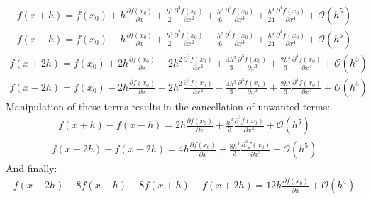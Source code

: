 \documentclass[12pt,a4]{article}
\begin{document}
\begin{enumerate}
\begin{enumerate}
\begin{align*}
          f(x + h) = f(x_0) + h \frac{\partial f(x_0)}{\partial x} + \frac{h^2}{2} \frac{\partial^2 f(x_0)}{\partial x^2} + \frac{h^3}{6} \frac{\partial^3 f(x_0)}{\partial x^3} + \frac{h^4}{24} \frac{\partial^4 f(x_0)}{\partial x^4} + \mathscr{O}(h^5) %
        \end{align*}
        \begin{align*}
          f(x - h) = f(x_0) - h \frac{\partial f(x_0)}{\partial x} + \frac{h^2}{2} \frac{\partial^2 f(x_0)}{\partial x^2} - \frac{h^3}{6} \frac{\partial^3 f(x_0)}{\partial x^3} + \frac{h^4}{24} \frac{\partial^4 f(x_0)}{\partial x^4} + \mathscr{O}(h^5) %
        \end{align*}
        \begin{align*}
          f(x + 2 h) = f(x_0) + 2 h \frac{\partial f(x_0)}{\partial x} + 2 h^2 \frac{\partial^2 f(x_0)}{\partial x^2} + \frac{4 h^3}{3} \frac{\partial^3 f(x_0)}{\partial x^3} + \frac{2 h^4}{3} \frac{\partial^4 f(x_0)}{\partial x^4} + \mathscr{O}(h^5) %
        \end{align*}
        \begin{align*}
          f(x - 2 h) = f(x_0) - 2 h \frac{\partial f(x_0)}{\partial x} + 2 h^2 \frac{\partial^2 f(x_0)}{\partial x^2} - \frac{4 h^3}{3} \frac{\partial^3 f(x_0)}{\partial x^3} + \frac{2 h^4}{3} \frac{\partial^4 f(x_0)}{\partial x^4} + \mathscr{O}(h^5) %
        \end{align*}
        Manipulation of these terms results in the cancellation of unwanted terms:
        \begin{align*}
          f(x + h) - f(x - h) =  2 h \frac{\partial f(x_0)}{\partial x} + \frac{h^3}{3} \frac{\partial^3 f(x_0)}{\partial x^3} + \mathscr{O}(h^5) %
        \end{align*}
        \begin{align*}
          f(x + 2 h) - f(x - 2 h) = 4 h \frac{\partial f(x_0)}{\partial x} + \frac{8 h^3}{3} \frac{\partial^3 f(x_0)}{\partial x^3} + \mathscr{O}(h^5) %
        \end{align*}
        And finally:
        \begin{align*}
          f(x - 2 h)- 8 f(x - h) + 8 f(x + h) - f(x + 2 h) =  12 h \frac{\partial f(x_0)}{\partial x} + \mathscr{O}(h^4) %

\end{align*}
\end{enumerate}
\end{enumerate}
\end{document}
